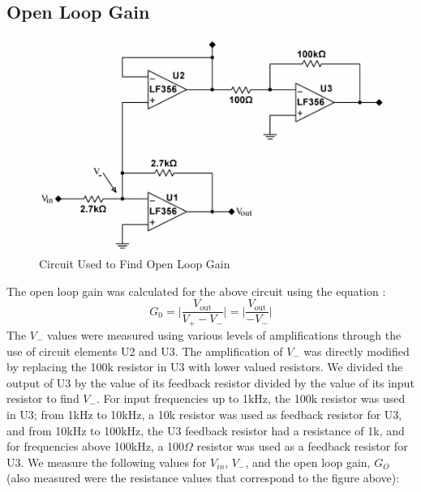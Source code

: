 \documentclass{article}
\begin{document}
\subsection{Open Loop Gain}
    \begin{figure}[H]
        \centering
        \includegraphics[scale = 0.5]{5.png}
        \caption{Circuit Used to Find Open Loop Gain \cite{lab8}}
        \label{fig:my_label}
    \end{figure}
    The open loop gain was calculated for the above circuit using the equation \cite{lab8}:
    \begin{equation}
        \displaystyle G_0 = \Bigg|\frac{V_\mathrm{out}}{V_+-V_-}\Bigg| =\Bigg|\frac{V_\mathrm{out}}{-V_-}\Bigg|
    \end{equation}
    The $V_-$ values were measured using various levels of amplifications through the use of circuit elements U2 and U3. The amplification of $V_-$ was directly modified by replacing the 100k resistor in U3 with lower valued resistors. We divided the output of U3 by the value of its feedback resistor divided by the value of its input resistor to find $V_-$. For input frequencies up to 1kHz, the 100k resistor was used in U3; from 1kHz to 10kHz, a 10k resistor was used as feedback resistor for U3, and from 10kHz to 100kHz, the U3 feedback resistor had a resistance of 1k, and for frequencies above 100kHz, a 100$\Omega$ resistor was used as a feedback resistor for U3. We measure the following values for $V_{in}$, $V_-$, and the open loop gain, $G_O$ (also measured were the  resistance values that correspond to the figure above):
\end{document}
